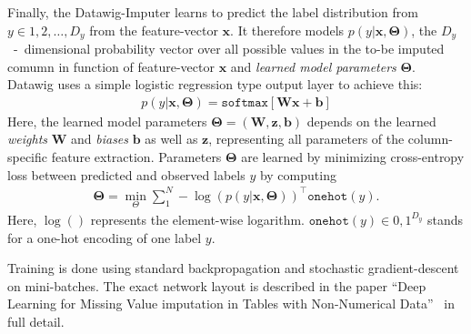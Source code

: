 Finally, the Datawig-Imputer learns to predict the label distribution from \( y \in {1, 2, \dots, D_y} \) from the feature-vector \( \mathbold{x} \).
It therefore models \( p(y|\mathbold{x},\mathbold{\Theta}) \), the \( D_y \)~-~dimensional probability vector over all possible values in the to-be imputed comumn in function of feature-vector \( \mathbold{x} \) and \emph{learned model parameters} \( \mathbold{\Theta} \).
Datawig uses a simple logistic regression type output layer to achieve this:
\begin{align}
    p(y|\mathbold{x},\mathbold{\Theta}) = \texttt{softmax}[\mathbold{Wx} + \mathbold{b}]
\end{align}
Here, the learned model parameters \( \mathbold{\Theta} = (\mathbold{W}, \mathbold{z}, \mathbold{b}) \) depends on the learned \emph{weights} \( \mathbold{W} \) and \emph{biases} \( \mathbold{b} \) as well as \( \mathbold{z} \), representing all parameters of the column-specific feature extraction.
Parameters \( \mathbold{\Theta} \) are learned by minimizing cross-entropy loss between predicted and observed labels \( y \) by computing
\begin{align}
    \mathbold{\Theta} = \min_{\Theta} \sum\nolimits_{1}^{N} - \log(p(y|\mathbold{x}, \mathbold{\Theta}))^\top \texttt{onehot}(y).
\end{align}
Here, \( \log() \) represents the element-wise logarithm.
\( \texttt{onehot}(y) \in {0, 1}^{D_y}\) stands for a one-hot encoding of one label \( y \).

Training is done using standard backpropagation and stochastic gradient-descent on mini-batches.
The exact network layout is described in the paper ``Deep Learning for Missing Value imputation in Tables with Non-Numerical Data''~\cite[p.2022]{BIE18} in full detail.



